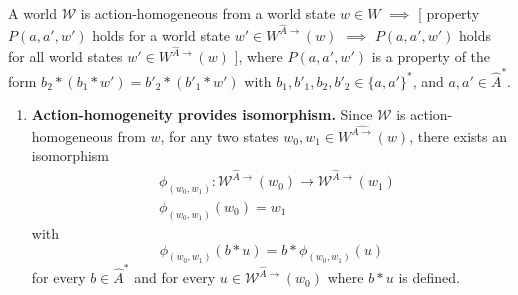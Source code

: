 \begin{propositionE}
    \label{prp:action_homogeneous_means_properties_for_w_hold_for_all_reachable_subworld}
    A world $\mathscr{W}$ is action-homogeneous from a world state $w \in W$ $\implies$ [ property $P(a, a', w')$ holds for a world state $w' \in W^{\hat{A}\to}(w)$ $\implies$ $P(a, a', w')$ holds for all world states $w' \in W^{\hat{A}\to}(w)$ ], where $P(a, a', w')$ is a property of the form $b_{2} \ast (b_{1} \ast w') = b'_{2} \ast (b'_{1} \ast w')$ with $b_{1}, b'_{1}, b_{2}, b'_{2} \in \{a, a'\}^{*}$, and $a, a' \in \hat{A}^{*}$.
\end{propositionE}
\begin{proofE}
\begin{enumerate}
    \item \textbf{Action-homogeneity provides isomorphism.}
    Since $\mathscr{W}$ is action-homogeneous from $w$, for any two states $w_{0}, w_{1} \in W^{\hat{A\to}}(w)$, there exists an isomorphism
    \begin{align}
        & \phi_{(w_{0}, w_{1})}: \mathscr{W}^{\hat{A}\to}(w_{0}) \to \mathscr{W}^{\hat{A}\to}(w_{1}) \\
        & \phi_{(w_{0}, w_{1})}(w_{0}) = w_{1}
    \end{align}
    with
    \begin{equation}
        \phi_{(w_{0}, w_{1})}(b \ast u) = b \ast \phi_{(w_{0}, w_{1})}(u)
    \end{equation}
    for every $b \in \hat{A}^{*}$ and for every $u \in \mathscr{W}^{\hat{A}\to}(w_{0})$ where $b \ast u$ is defined.


\end{enumerate}
\end{proofE}
